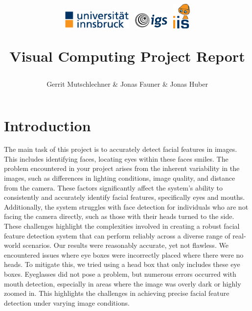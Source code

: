 \documentclass[11pt, a4paper, twocolumn]{article}
\title{
\begin{flushleft}
\includegraphics[width=3.5cm]{images/uibknew.eps}
\hfill
\includegraphics[width=1.8cm]{images/igslogo.png}
\hspace{0.3cm}
\includegraphics[width=0.9cm]{images/iislogo.png}
\end{flushleft}\vspace{0.5cm}
Visual Computing Project Report}
\author{Gerrit Mutschlechner \& Jonas Fauner \& Jonas Huber}
\begin{document}
\maketitle

\thispagestyle{empty}


\section*{Introduction}

The main task of this project is to accurately detect facial features in images. This includes identifying faces, locating eyes within these faces smiles.
The problem encountered in your project arises from the inherent variability in the images, such as differences in lighting conditions, image quality, and distance from the camera. These factors significantly affect the system's ability to consistently and accurately identify facial features, specifically eyes and mouths. Additionally, the system struggles with face detection for individuals who are not facing the camera directly, such as those with their heads turned to the side. These challenges highlight the complexities involved in creating a robust facial feature detection system that can perform reliably across a diverse range of real-world scenarios. \cite{GreatLearning2023}
Our results were reasonably accurate, yet not flawless. We encountered issues where eye boxes were incorrectly placed where there were no heads. To mitigate this, we tried using a head box that only includes these eye boxes. Eyeglasses did not pose a problem, but numerous errors occurred with mouth detection, especially in areas where the image was overly dark or highly zoomed in. This highlights the challenges in achieving precise facial feature detection under varying image conditions.
\end{document}
